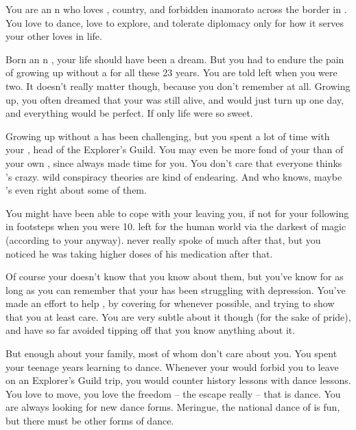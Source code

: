 \documentclass[char]{NeptuneBall}
\begin{document}
\name{\cPrincess{}}


You are an \pAtlantis{}n \cPrincess{\prince} who loves \cPrincess{\them} \cKing{\parent}, \cPrincess{\them} country, and \cPrincess{\them} forbidden inamorato across the border in \pPacifica{}. You love to dance, love to explore, and tolerate diplomacy only for how it serves your other loves in life.

Born an \pAtlantis{}n \cPrincess{\prince}, your life should have been a dream. But you had to endure the pain of growing up without a \cQueen{\parent} for all these 23 years. You are told \cQueen{\they} left when you were two. It doesn't really matter though, because you don't remember \cQueen{\them} at all. Growing up, you often dreamed that your \cQueen{\parent} was still alive, and would just turn up one day, and everything would be perfect. If only life were so sweet.

Growing up without a \cQueen{\parent} has been challenging, but you spent a lot of time with your \cPlant{\uncle} \cPlant{}, head of the Explorer's Guild. You may even be more fond of your \cPlant{\uncle} than of your own \cKing{\parent}, since \cPlant{} always made time for you. You don't care that everyone thinks \cPlant{\they}'s crazy. \cPlant{\Their} wild conspiracy theories are kind of endearing. And who knows, maybe \cPlant{\they}'s even right about some of them.

You might have been able to cope with your \cQueen{\parent} leaving you, if not for your \cAriel{\sibling} following in \cQueen{\them} footsteps when you were 10. \cAriel{} left for the human world via the darkest of magic (according to your \cKing{\parent} anyway). \cKing{\They} never really spoke of \cAriel{\them} much after that, but you noticed he was taking higher doses of his medication after that.

Of course your \cKing{\parent} doesn't know that you know about them, but you've know for as long as you can remember that your \cKing{\parent} has been struggling with depression. You've made an effort to help \cKing{\them}, by covering for \cKing{\them} whenever possible, and trying to show \cKing{\them} that you at least care. You are very subtle about it though (for the sake of \cKing{\their} pride), and have so far avoided tipping \cKing{\them} off that you know anything about it.

But enough about your family, most of whom don't care about you. You spent your teenage years learning to dance. Whenever your \cKing{\parent} would forbid you to leave on an Explorer's Guild trip, you would counter \cKing{\them} history lessons with dance lessons.  You love to move, you love the freedom -- the escape really -- that is dance. You are always looking for new dance forms. Meringue, the national dance of \pAtlantis{} is fun, but there must be other forms of dance.
\end{document}
